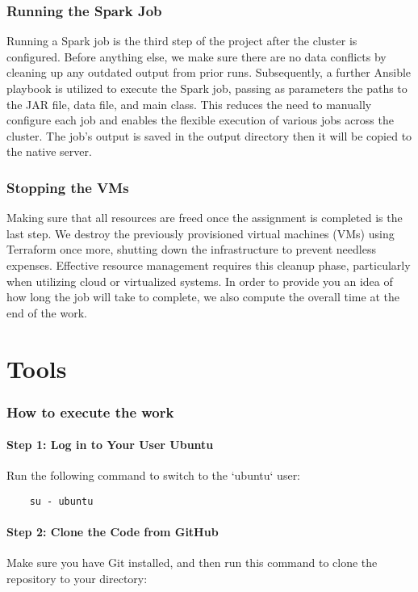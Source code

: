 \documentclass{article}
\begin{document}
\section{Running the Spark Job}

Running a Spark job is the third step of the project after the cluster is configured. Before anything else, we make sure there are no data conflicts by cleaning up any outdated output from prior runs. Subsequently, a further Ansible playbook is utilized to execute the Spark job, passing as parameters the paths to the JAR file, data file, and main class. This reduces the need to manually configure each job and enables the flexible execution of various jobs across the cluster. The job's output is saved in the output directory then it will be copied to the native server.

\section{Stopping the VMs}

Making sure that all resources are freed once the assignment is completed is the last step. We destroy the previously provisioned virtual machines (VMs) using Terraform once more, shutting down the infrastructure to prevent needless expenses. Effective resource management requires this cleanup phase, particularly when utilizing cloud or virtualized systems. In order to provide you an idea of how long the job will take to complete, we also compute the overall time at the end of the work.

\part{Tools}

\section{How to execute the work}


\subsection{Step 1: Log in to Your User Ubuntu}
Run the following command to switch to the `ubuntu` user:

\begin{verbatim}
    su - ubuntu
\end{verbatim}

\subsection{Step 2: Clone the Code from GitHub}
Make sure you have Git installed, and then run this command to clone the repository to your directory:
\end{document}
